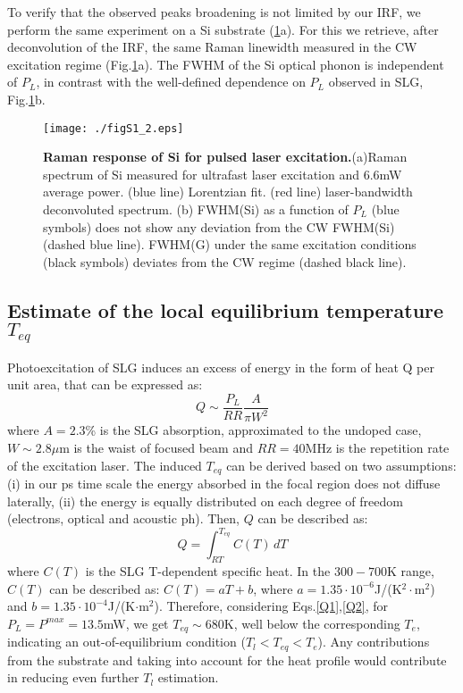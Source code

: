 \documentclass[aps, prl,twocolumn]{revtex4}
\begin{document}
To verify that the observed peaks broadening is not limited by our IRF, we perform the same experiment on a Si substrate (\ref{figS1}a). For this we retrieve, after deconvolution of the IRF, the same Raman linewidth measured in the CW excitation regime (Fig.\ref{figS1}a). The FWHM of the Si optical phonon is independent of $P_L$, in contrast with the well-defined dependence on $P_L$ observed in SLG, Fig.\ref{figS1}b.
\begin{figure}[h!]
	\centerline{\texttt{[image: ./figS1\_2.eps]}}
	\caption{\textbf{Raman response of Si for pulsed laser excitation.}(a)Raman spectrum of Si measured for ultrafast laser excitation and 6.6mW average power. (blue line) Lorentzian fit. (red line) laser-bandwidth deconvoluted spectrum. (b) FWHM(Si) as a function of $P_L$ (blue symbols) does not show any deviation from the CW FWHM(Si) (dashed blue line). FWHM(G) under the same excitation conditions (black symbols) deviates from the CW regime (dashed black line).}
	\label{figS1}
\end{figure}
\subsection*{Estimate of the local equilibrium temperature $T_{eq}$}
Photoexcitation of SLG induces an excess of energy in the form of heat Q per unit area, that can be expressed as:
\begin{equation}
Q\sim\frac{P_L}{RR}\frac{A}{\pi W^2}
\label{Q1}
\end{equation}
where $A=2.3$\% is the SLG absorption, approximated to the undoped case\cite{Nair2008}, $W\sim2.8\mu$m is the waist of focused beam and $RR=40$MHz is the repetition rate of the excitation laser.
The induced $T_{eq}$ can be derived based on two assumptions: (i) in our ps time scale the energy absorbed in the focal region does not diffuse laterally, (ii) the energy is equally distributed on each degree of freedom (electrons, optical and acoustic ph). Then, $Q$ can be described as:
\begin{equation}
Q=\int_{RT}^{T_{eq}}C(T)\,dT
\label{Q2}
\end{equation}
where $C(T)$ is the SLG T-dependent specific heat. In the $300-700$K range, $C(T)$ can be described as\cite{Pop2012}: $C(T)=aT+b$, where $a=1.35\cdot10^{-6}$J/(K$^2\cdot$m$^2$) and $b=1.35\cdot10^{-4}$J/(K$\cdot$m$^2$). Therefore, considering Eqs.\ref{Q1},\ref{Q2}, for $P_L=P^{max}=13.5$mW, we get $T_{eq}\sim680$K, well below the corresponding $T_e$, indicating an out-of-equilibrium condition ($T_l<T_{eq}<T_{e}$). Any contributions from the substrate and taking into account for the heat profile would contribute in reducing even further $T_l$ estimation.
\end{document}
